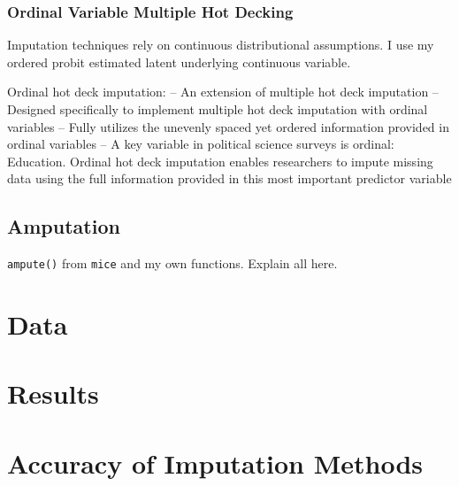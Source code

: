 \documentclass[12pt,econ]{sources/authesis}
\begin{document}
\hypertarget{ordmiss-theory-multimpute-hdord}{%
\subsubsection{Ordinal Variable Multiple Hot Decking}\label{ordmiss-theory-multimpute-hdord}}

Imputation techniques rely on continuous distributional assumptions.
I use my ordered probit estimated latent underlying continuous variable.

Ordinal hot deck imputation:
-- An extension of multiple hot deck imputation
-- Designed specifically to implement multiple hot deck imputation with ordinal variables
-- Fully utilizes the unevenly spaced yet ordered information provided in ordinal variables
-- A key variable in political science surveys is ordinal: Education. Ordinal hot deck imputation enables researchers to impute missing data using the full information provided in this most important predictor variable

\hypertarget{ordmiss-theory-ampute}{%
\subsection{Amputation}\label{ordmiss-theory-ampute}}

\texttt{ampute()} from \texttt{mice} and my own functions. Explain all here.

\hypertarget{ordmiss-data}{%
\section{Data}\label{ordmiss-data}}

\hypertarget{ordmiss-results}{%
\section{Results}\label{ordmiss-results}}

\hypertarget{ordmiss-results-acc-stand}{%
\section{Accuracy of Imputation Methods}\label{ordmiss-results-acc-stand}}
\end{document}
